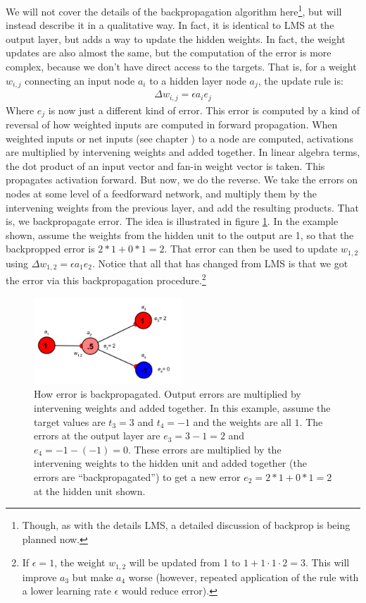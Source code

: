 We will not cover the details of the backpropagation algorithm here\footnote{Though, as with the details LMS, a detailed discussion of backprop is being planned now.}, but will instead describe it in a qualitative way. In fact, it is identical to LMS at the output layer, but adds a way to update the hidden weights. In fact, the weight updates are also almost the same, but the computation of the error is more complex, because we don't have direct access to the targets. That is, for a weight $w_{i,j}$ connecting an input node $a_i$ to a hidden layer node $a_j$, the update rule is:
\begin{eqnarray*}
\Delta w_{i,j}  =  \epsilon a_i e_j
\end{eqnarray*}
Where $e_j$ is now just a different kind of error. This error is computed by a kind of reversal of how weighted inputs are computed in forward propagation. When weighted inputs or net inputs (see chapter ) to a node are computed, activations are multiplied by intervening weights and added together. In linear algebra terms, the dot product of an input vector and fan-in weight vector is taken. This propagates activation forward. But now, we do the reverse. We take the errors on nodes at some level of a feedforward network, and multiply them by the intervening weights from the previous layer, and add the resulting products.  That is, we backpropagate error. The idea is illustrated in figure \ref{backprop_error}. In the example shown, assume the weights from the hidden unit to the output are 1, so that the backpropped error is $2 * 1 + 0 * 1 = 2$. That error can then be used to update $w_{1,2}$ using  $\Delta w_{1,2}  =  \epsilon a_1 e_2$. Notice that all that has changed from LMS is that we got the error via this backpropagation procedure.\footnote{If $\epsilon = 1$, the weight  $w_{1,2}$ will be updated from 1 to $1 + 1 \cdot 1 \cdot 2 = 3$. This will improve $a_3$ but make $a_4$ worse (however, repeated application of the rule with a lower learning rate $\epsilon$  would reduce error).}
\begin{figure}[h]
\centering
\includegraphics[width=0.5\textwidth]{images/backpropError}
\caption[Jeff Yoshimi.]{How error is backpropagated. Output errors are multiplied by intervening weights and added together. In this example, assume the target values are $t_3 = 3$ and $t_4 = -1$ and the weights are all $1$. The errors at the output layer are $e_3 = 3-1=2$ and $e_4 = -1 - (-1) =  0$.  These errors are multiplied by the intervening weights to the hidden unit and added together (the errors are ``backpropagated'') to get a new error $e_2 = 2 * 1 + 0 * 1 = 2$ at the hidden unit shown.}
\label{backprop_error}
\end{figure}

